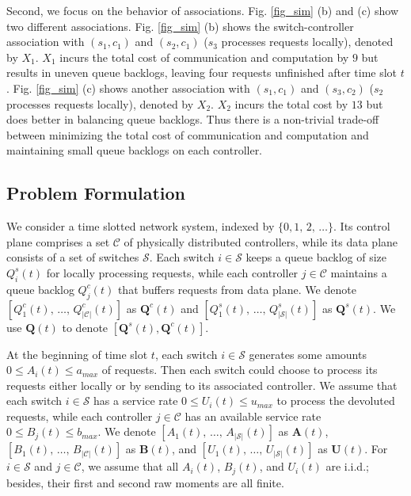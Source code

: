 \documentclass[10pt,journal,compsoc]{IEEEtran}
\begin{document}
Second, we focus on the behavior of associations. Fig. \ref{fig_sim} (b) and (c) show two different associations. Fig. \ref{fig_sim} (b) shows the switch-controller association with $(s_1, c_1)$ and $(s_2, c_1)$ ($s_3$ processes requests locally), denoted by $X_1$. $X_1$ incurs the total cost of communication and computation by $9$ but results in uneven queue backlogs, leaving four requests unfinished after time slot $t$. Fig. \ref{fig_sim} (c) shows another association with $(s_1, c_1)$ and $(s_3, c_2)$ ($s_2$ processes requests locally), denoted by $X_2$. $X_2$ incurs the total cost by $13$ but does better in balancing queue backlogs. Thus there is a non-trivial trade-off between minimizing the total cost of communication and computation and maintaining small queue backlogs on each controller.

\subsection{Problem Formulation}

We consider a time slotted network system, indexed by $\{0,1,\,2,\,\dots\}$. Its control plane comprises a set $\mathcal{C}$ of physically distributed controllers, while its data plane consists of a set of switches $\mathcal{S}$. 
Each switch $i \in \mathcal{S}$ keeps a queue backlog of size $Q^s_i(t)$ for locally processing requests, while each controller $j \in \mathcal{C}$ maintains a queue backlog $Q^c_j(t)$ that buffers requests from data plane. We denote $[ Q^c_1(t),\,\dots,\,Q^c_{|\mathcal{C}|}(t) ]$ as $\mathbf{Q}^c(t)$ and $[ Q^s_1(t),\,\dots,\,Q^s_{|\mathcal{S}|}(t) ]$ as $\mathbf{Q}^s(t)$. We use $\mathbf{Q}(t)$ to denote $[\mathbf{Q}^s(t), \mathbf{Q}^c(t)]$.

At the beginning of time slot $t$, each switch $i \in \mathcal{S}$ generates some amounts $0 \le A_i(t) \le a_{max}$ of requests. Then each switch could choose to process its requests either locally or by sending to its associated controller. We assume that each switch $i \in \mathcal{S}$ has a service rate $0 \le U_i(t) \le u_{max}$ to process the devoluted requests, while each controller $j \in \mathcal{C}$ has an available service rate $0 \le B_j(t) \le b_{max}$. We denote $[ A_1(t),\,\dots,\,A_{|\mathcal{S}|}(t) ]$ as $\mathbf{A}(t)$, $[ B_1(t),\,\dots,\,B_{|\mathcal{C}|}(t) ]$ as $\mathbf{B}(t)$, and $\left[ U_1(t),\,\dots,\,U_{|\mathcal{S}|}(t) \right]$ as $\mathbf{U}(t)$. For $i \in \mathcal{S}$ and $j \in \mathcal{C}$, we assume that all $A_i(t)$, $B_j(t)$, and $U_i(t)$ are i.i.d.; besides, their first and second raw moments are all finite.
\end{document}
